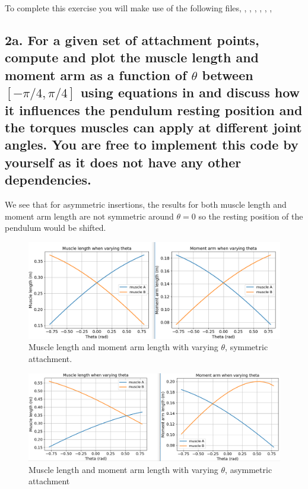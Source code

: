 \documentclass{cmc}
\begin{document}
To complete this exercise you will make use of the following files,
, ,
, , ,
,  %

\label{sec:questions}

\subsection*{2a. For a given set of attachment points, compute and
  plot the muscle length and moment arm as a function of $\theta$
  between $[-\pi/4, \pi/4]$ using equations in 
  and discuss how it influences the pendulum resting position and the
  torques muscles can apply at different joint angles. You are free to implement
this code by yourself as it does not have any other dependencies.}
We see that for asymmetric insertions, the results for both muscle length and moment arm length are not symmetric around $\theta=0$ so the resting position of the pendulum would be shifted. 
\label{sec:2a}
\begin{figure}[H]
  \centering
  \includegraphics[scale=0.7]{figures/fig3}
  \caption{Muscle length and moment arm length with varying $\theta$, symmetric attachment.}
  \label{fig:2a}
\end{figure}
\begin{figure}[H]
  \centering
  \includegraphics[scale=0.6]{figures/fig4}
  \caption{Muscle length and moment arm length with varying $\theta$, asymmetric attachment }
  \label{fig:2abis}
\end{figure}
\end{document}
